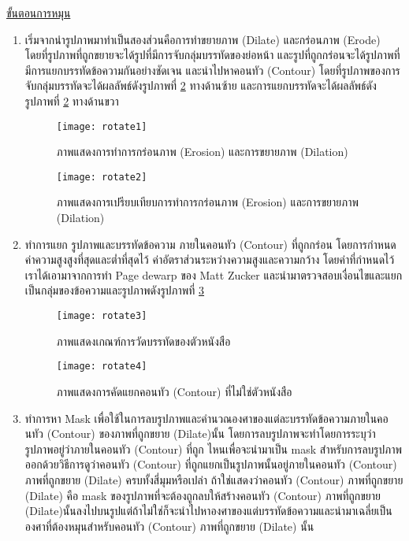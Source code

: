 \underline{ขั้นตอนการหมุน}

\begin{enumerate}
    \item เริ่มจากนำรูปภาพมาทำเป็นสองส่วนคือการทำขยายภาพ (Dilate) และกร่อนภาพ (Erode) โดยที่รูปภาพที่ถูกขยายจะได้รูปที่มีการจับกลุ่มบรรทัดของย่อหน้า และรูปที่ถูกกร่อนจะได้รูปภาพที่มีการแยกบรรทัดข้อความกันอย่างชัดเจน และนำไปหาคอนทัว (Contour) โดยที่รูปภาพของการจับกลุ่มบรรทัดจะได้ผลลัพธ์ดังรูปภาพที่ \ref{fig:rotate2} ทางด้านซ้าย และการแยกบรรทัดจะได้ผลลัพธ์ดังรูปภาพที่ \ref{fig:rotate2} ทางด้านขวา 
    
    \begin{figure}[H]
        \centering
        \texttt{[image: rotate1]}
        \caption{ภาพแสดงการทำการกร่อนภาพ (Erosion) และการขยายภาพ (Dilation)}\label{fig:rotate1}
    \end{figure}
    
    \begin{figure}[H]
        \centering
        \texttt{[image: rotate2]}
        \caption{ภาพแสดงการเปรียบเทียบการทำการกร่อนภาพ (Erosion) และการขยายภาพ (Dilation)}\label{fig:rotate2}
    \end{figure}

    \item ทำการแยก รูปภาพและบรรทัดข้อความ ภายในคอนทัว (Contour) ที่ถูกกร่อน โดยการกำหนดค่าความสูงสูงที่สุดและต่ำที่สุดไว้ ค่าอัตราส่วนระหว่างความสูงและความกว้าง โดยค่าที่กำหนดไว้เราได้เอามาจากการทำ Page dewarp ของ Matt Zucker \cite{mattzuck} และนำมาตรวจสอบเงื่อนไขและแยกเป็นกลุ่มของข้อความและรูปภาพดังรูปภาพที่ \ref{fig:rotate3}
    
    \begin{figure}[H]
        \centering
        \texttt{[image: rotate3]}
        \caption{ภาพแสดงเกณฑ์การวัดบรรทัดของตัวหนังสือ}\label{fig:rotate3}
    \end{figure}
    
    \begin{figure}[H]
        \centering
        \texttt{[image: rotate4]}
        \caption{ภาพแสดงการคัดแยกคอนทัว (Contour) ที่ไม่ใช่ตัวหนังสือ}\label{fig:rotate4}
    \end{figure}

    \item ทำการหา Mask เพื่อใช้ในการลบรูปภาพและคำนวณองศาของแต่ละบรรทัดข้อความภายในคอนทัว (Contour) ของภาพที่ถูกขยาย (Dilate)นั้น โดยการลบรูปภาพจะทำโดยการระบุว่ารูปภาพอยู่ว่าภายในคอนทัว (Contour) ที่ถูก ไหนเพื่อจะนำมาเป็น mask สำหรับการลบรูปภาพออกด้วยวิธีการดูว่าคอนทัว (Contour) ที่ถูกแยกเป็นรูปภาพนั้นอยู่ภายในคอนทัว (Contour) ภาพที่ถูกขยาย (Dilate) ครบทั้งสี่มุมหรือเปล่า ถ้าใช่แสดงว่าคอนทัว (Contour) ภาพที่ถูกขยาย (Dilate) คือ mask ของรูปภาพที่จะต้องถูกลบให้สร้างคอนทัว (Contour) ภาพที่ถูกขยาย (Dilate)นั้นลงไปบนรูปแต่ถ้าไม่ใช่ก็จะนำไปหาองศาของแต่บรรทัดข้อความและนำมาเฉลี่ยเป็นองศาที่ต้องหมุนสำหรับคอนทัว (Contour) ภาพที่ถูกขยาย (Dilate) นั้น
    

\end{enumerate}
